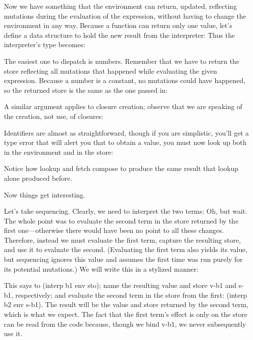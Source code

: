 
Now we have something that the environment can return, updated, reflecting
mutations during the evaluation of the expression, without having to change the
environment in any way. Because a function can return only one value, let’s
define a data structure to hold the new result from the interpreter:
Thus the interpreter’s type becomes:

The easiest one to dispatch is numbers. Remember that we have to return the
store reflecting all mutations that happened while evaluating the given
expression. Because a number is a constant, no mutations could have happened, so
the returned store is the same as the one passed in:

A similar argument applies to closure creation; observe that we are speaking of
the creation, not use, of closures:

Identifiers are almost as straightforward, though if you are simplistic, you’ll
get a type error that will alert you that to obtain a value, you must now look
up both in the environment and in the store:

Notice how lookup and fetch compose to produce the same result that lookup
alone produced before.

Now things get interesting.

Let’s take sequencing. Clearly, we need to interpret the two terms:
Oh, but wait. The whole point was to evaluate the second term in the store
returned by the first one—otherwise there would have been no point to all these
changes. Therefore, instead we must evaluate the first term, capture the
resulting store, and use it to evaluate the second. (Evaluating the first term
also yields its value, but sequencing ignores this value and assumes the first
time was run purely for its potential mutations.) We will write this in a
stylized manner:

This says to (interp b1 env sto); name the resulting value and store v-b1 and
s-b1, respectively; and evaluate the second term in the store from the first:
(interp b2 env s-b1). The result will be the value and store returned by the
second term, which is what we expect. The fact that the first term’s effect is
only on the store can be read from the code because, though we bind v-b1, we
never subsequently use it.

